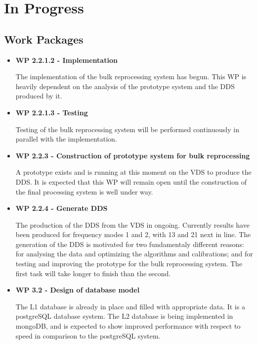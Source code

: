 \chapter{In Progress}
\label{chapter:in_progress}



\section{Work Packages}

\begin{itemize}


\item{\bf WP 2.2.1.2 - Implementation}

The implementation of the bulk reprocessing system has begun. This WP is heavily dependent on the analysis of the prototype system and the DDS produced by it.

\item{\bf WP 2.2.1.3 - Testing}

Testing of the bulk reprocessing system will be performed continuously in parallel with the implementation. 


\item{\bf WP 2.2.3 - Construction of prototype system for bulk reprocessing}

A prototype exists and is running at this moment on the VDS to produce the DDS. It is expected that this WP will remain open until the construction of the final processing system is well under way.  


\item{\bf WP 2.2.4 - Generate DDS}

The production of the DDS from the VDS in ongoing. Currently results have been produced for frequency modes 1 and 2, with 13 and 21 next in line. The generation of the DDS is motivated for two fundamentaly different reasons: for analysing the data and optimizing the algorithms and calibrations; and for testing and improving the prototype for the bulk reprocessing system. The first task will take longer to finish than the second.


\item{\bf WP 3.2 - Design of database model}

The L1 database is already in place and filled with appropriate data. It is a postgreSQL database system. The L2 database is being implemented in mongoDB, and is expected to show improved performance with respect to speed in comparison to the postgreSQL system.  



\end{itemize}
